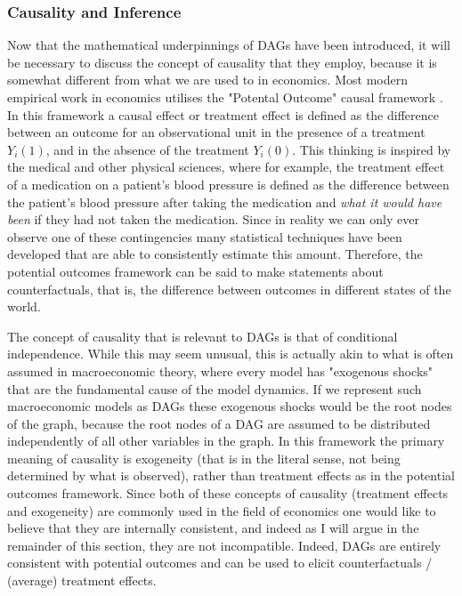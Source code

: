 \documentclass{article}
\begin{document}
\subsubsection{Causality and Inference} \label{cause}

Now that the mathematical underpinnings of DAGs have been introduced, it will be necessary to discuss the concept of causality that they employ, because it is somewhat different from what we are used to in economics. Most modern empirical work in economics utilises the "Potental Outcome" causal framework \parencite{holland1986statistics}. In this framework a causal effect or treatment effect is defined as the difference between an outcome for an observational unit in the presence of a treatment $Y_i(1)$, and in the absence of the treatment $Y_i(0)$. This thinking is inspired by the medical and other physical sciences, where for example, the treatment effect of a medication on a patient's blood pressure is defined as the difference between the patient's blood pressure after taking the medication and \textit{what it would have been} if they had not taken the medication. Since in reality we can only ever observe one of these contingencies many statistical techniques have been developed that are able to consistently estimate this amount. Therefore, the potential outcomes framework can be said to make statements about counterfactuals, that is, the difference between outcomes in different states of the world.

The concept of causality that is relevant to DAGs is that of conditional independence. While this may seem unusual, this is actually akin to what is often assumed in macroeconomic theory, where every model has "exogenous shocks" that are the fundamental cause of the model dynamics. If we represent such macroeconomic models as DAGs these exogenous shocks would be the root nodes of the graph, because the root nodes of a DAG are assumed to be distributed independently of all other variables in the graph. In this framework the primary meaning of causality is exogeneity (that is in the literal sense, not being determined by what is observed), rather than treatment effects as in the potential outcomes framework. Since both of these concepts of causality (treatment effects and exogeneity) are commonly used in the field of economics one would like to believe that they are internally consistent, and indeed as I will argue in the remainder of this section, they are not incompatible. Indeed, DAGs are entirely consistent with potential outcomes and can be used to elicit counterfactuals / (average) treatment effects.
\end{document}
